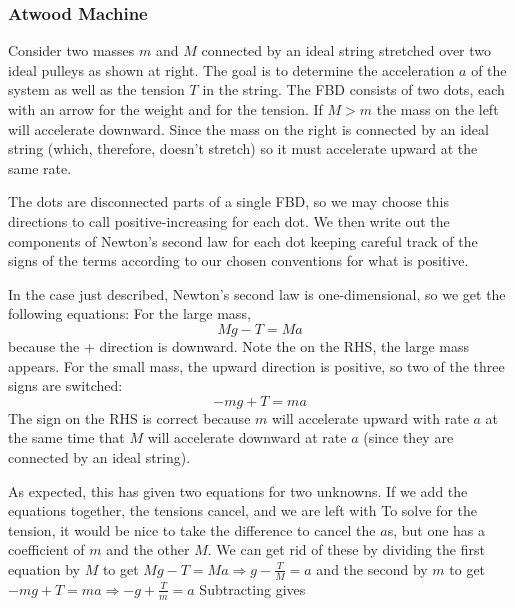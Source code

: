 \subsubsection{Atwood Machine}

Consider two masses $m$ and $M$ connected by an ideal string stretched over two ideal pulleys as shown at right. The goal is to determine the acceleration $a$ of the system as well as the tension $T$ in the string. 
The FBD consists of two dots, each with an arrow for the weight and for the tension. If $M>m$ the mass on the left will accelerate downward. Since the mass on the right is connected by an ideal string (which, therefore, doesn't stretch) so it must accelerate upward at the same rate. 

The dots are disconnected parts of a single FBD, so we may choose this directions to call positive-increasing for each dot. We then write out the components of Newton's second law for each dot keeping careful track of the signs of the terms according to our chosen conventions for what is positive. 

In the case just described, Newton's second law is one-dimensional, so we get the following equations: For the large mass, 
$$
Mg - T = Ma
$$
because the + direction is downward. Note the on the RHS, the large mass appears. For the small mass, the upward direction is positive, so two of the three signs are switched:
$$
- mg + T = ma
$$
The sign on the RHS is correct because $m$ will accelerate upward with rate $a$ at the same time that $M$ will accelerate downward at rate $a$ (since they are connected by an ideal string).

As expected, this has given two equations for two unknowns. If we add the equations together, the tensions cancel, and we are left with 
To solve for the tension, it would be nice to take the difference to cancel the $a$s, but one has a coefficient of $m$ and the other $M$. We can get rid of these by dividing the first equation by $M$ to get 
$
Mg - T = Ma 
⇒
g -\frac TM  = a 
$
and the second by $m$ to get
$
- mg + T = ma
⇒ 
- g +\frac Tm  = a 
$
Subtracting gives

